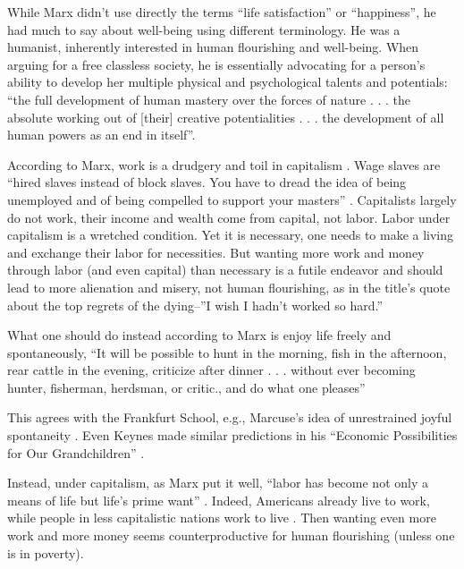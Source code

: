 \documentclass[10pt, letterpaper]{article}
\begin{document}
\begin{spacing}{1.8}
While Marx didn't use directly the terms ``life satisfaction'' or ``happiness'', he had much to say about well-being using different terminology. He was a humanist, inherently interested in human flourishing and well-being.
When arguing for a free classless society, he is essentially advocating for a person's ability to develop her multiple physical and psychological talents and potentials: ``the full development of human mastery over
the forces of nature . . . the absolute working out of [their] creative
potentialities . . . the development of all human powers as an end in
itself''\citep[cited in][p. 91]{struhl16}.
% 

According to Marx, work is a drudgery and toil in capitalism \citep{marx10, lyons07}.
%
%
Wage slaves are ``hired slaves instead of block slaves. You have to dread the idea of being unemployed and of being compelled to support your masters'' \citep[p. 283][]{goldman03}.
% 
Capitalists largely do not work, their income and
wealth come from capital, not labor. %
Labor under capitalism is a wretched condition. Yet it is necessary, one needs
to make a living and exchange their labor for necessities. But wanting more work
and money through labor (and even capital) than necessary is a futile endeavor and should lead to
more alienation and misery, not human flourishing, as in the title's
quote about the top regrets of the dying--''I wish I hadn't worked so hard.''

What one should do instead according to Marx is enjoy life freely and spontaneously, ``It will be possible to hunt in the morning, fish in the afternoon, rear cattle in the evening, criticize after dinner . . . without ever becoming hunter, fisherman, herdsman, or critic., and do what one pleases''

This agrees with the Frankfurt School, e.g., Marcuse's idea of unrestrained joyful spontaneity \citep{marcuse15}. Even Keynes made similar predictions in his ``Economic Possibilities for Our Grandchildren'' \citep{keynes30}.

Instead, under capitalism, as Marx put it  well, ``labor has become not only a
means of life but life's prime want'' \citep[cited in][p. 91]{struhl16}. Indeed,
Americans already live to work, while people in less capitalistic nations work
to live \citep{aokditella}. Then wanting even more work and more money seems counterproductive for human flourishing (unless one is in poverty). 


\end{spacing}
\end{document}
